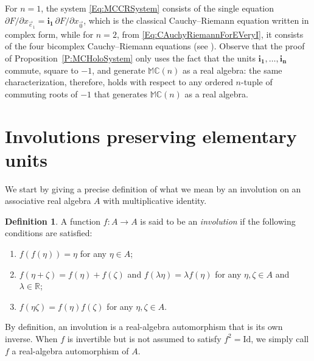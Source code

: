 \documentclass[12pt]{amsart}
\theoremstyle{plain}
\theoremstyle{definition}
\newtheorem{definition}[theorem]{Definition}
\numberwithin{equation}{section}
\newcommand{\im}[1]{\mathbf{ i_{#1}}}
\newcommand{\mC}{\mathbb{C}}
\newcommand{\mR}{\mathbb{R}}
\newcommand{\mM}{\mathbb{M}}
\newcommand{\ra}{\rightarrow}
\begin{document}
For $n = 1$, the system \eqref{Eq:MCCRSystem} consists of the single equation $\partial F / \partial x_{\vec e_1} = \im{1}\, \partial F / \partial x_{\vec 0}$, which is the classical Cauchy--Riemann equation written in complex form, while for $n = 2$, from \eqref{Eq:CAuchyRiemannForEVeryI}, it consists of the four bicomplex Cauchy--Riemann equations (see \cite[Theorem 7.3.1]{Bicomplex}). Observe that the proof of Proposition~\ref{P:MCHoloSystem} only uses the fact that the units $\im{1} , \ldots , \im{n}$ commute, square to $-1$, and generate $\mM \mC(n)$ as a real algebra: the same characterization, therefore, holds with respect to any ordered  $n$-tuple of commuting roots of $-1$ that generates $\mM \mC (n)$ as a real algebra. 


\section{Involutions preserving elementary units}\label{S:InvoPreserveElemUnits}

We start by giving a precise definition of what we mean by an involution on an associative real algebra $A$ with multiplicative identity.
        \begin{definition}\label{D:Involution}
        A function $f : A \ra A$ is said to be an \textit{involution} if the following conditions are satisfied:
            \begin{enumerate}[label=(\alph*)]
            \item $f (f (\eta )) = \eta$ for any $\eta \in A$;
            \item $f (\eta + \zeta ) = f (\eta ) + f (\zeta )$ and $f (\lambda \eta ) = \lambda f(\eta )$ for any $\eta , \zeta \in  A$ and $\lambda \in \mR $;
            \item $f (\eta \zeta ) = f (\eta ) f (\zeta )$ for any $\eta, \zeta \in  A$.
            \end{enumerate}
        \end{definition}
By definition, an involution is a real-algebra automorphism that is its own inverse. When $f$ is invertible but is not assumed to satisfy $f^2=\mathrm{Id}$, we simply call $f$ a real-algebra automorphism of $A$.
\end{document}
